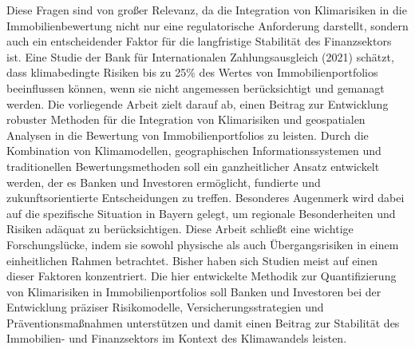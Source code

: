 Diese Fragen sind von großer Relevanz, da die Integration von Klimarisiken in die Immobilienbewertung nicht nur eine regulatorische Anforderung darstellt, sondern auch ein entscheidender Faktor für die langfristige Stabilität des Finanzsektors ist. Eine Studie der Bank für Internationalen Zahlungsausgleich (2021) schätzt, dass klimabedingte Risiken bis zu 25\% des Wertes von Immobilienportfolios beeinflussen können, wenn sie nicht angemessen berücksichtigt und gemanagt werden.
Die vorliegende Arbeit zielt darauf ab, einen Beitrag zur Entwicklung robuster Methoden für die Integration von Klimarisiken und geospatialen Analysen in die Bewertung von Immobilienportfolios zu leisten. Durch die Kombination von Klimamodellen, geographischen Informationssystemen und traditionellen Bewertungsmethoden soll ein ganzheitlicher Ansatz entwickelt werden, der es Banken und Investoren ermöglicht, fundierte und zukunftsorientierte Entscheidungen zu treffen. Besonderes Augenmerk wird dabei auf die spezifische Situation in Bayern gelegt, um regionale Besonderheiten und Risiken adäquat zu berücksichtigen.
Diese Arbeit schließt eine wichtige Forschungslücke, indem sie sowohl physische als auch Übergangsrisiken in einem einheitlichen Rahmen betrachtet. Bisher haben sich Studien meist auf einen dieser Faktoren konzentriert. Die hier entwickelte Methodik zur Quantifizierung von Klimarisiken in Immobilienportfolios soll Banken und Investoren bei der Entwicklung präziser Risikomodelle, Versicherungsstrategien und Präventionsmaßnahmen unterstützen und damit einen Beitrag zur Stabilität des Immobilien- und Finanzsektors im Kontext des Klimawandels leisten.